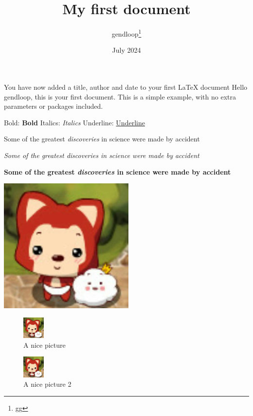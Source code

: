 \documentclass[12pt, a4paper]{article}
\title{My first document}
\author{gendloop\thanks{gg}}
\date{July 2024}
\begin{document}
\maketitle
You have now added a title, author and date to your first \LaTeX{} document
Hello gendloop, this is your first document.
This is a simple example, with no extra parameters or packages included.


Bold: \textbf{Bold}
Italics: \textit{Italics}
Underline: \underline{Underline}

Some of the greatest \emph{discoveries} in science were made by accident

\textit{Some of the greatest \emph{discoveries} in science were made by accident}

\textbf{Some of the greatest \emph{discoveries} in science were made by accident}


\includegraphics{favicon.png}

\begin{figure}[H]
    \centering
    \includegraphics[width=0.1\textwidth]{favicon.png}
    \caption{A nice picture}
    \label{fig:mesh1}
\end{figure}

\begin{figure}[H]
    \centering
    \includegraphics[width=0.1\textwidth]{favicon.png}
    \caption{A nice picture 2}
    \label{fig:mesh2}
\end{figure}
\end{document}
